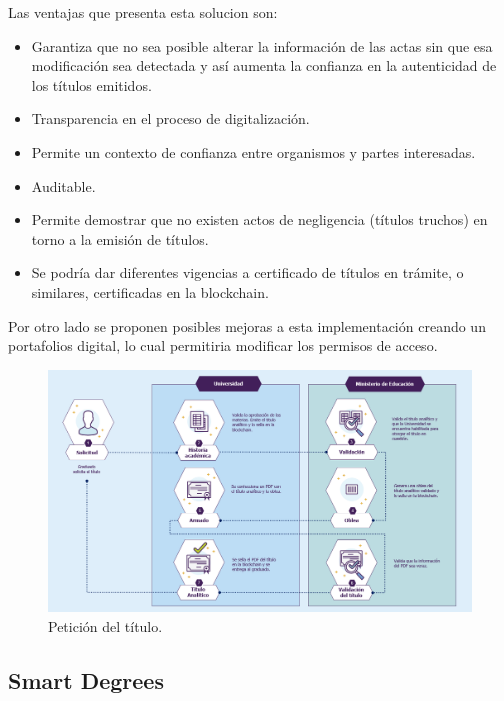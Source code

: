 \documentclass[11pt,a4paper]{article}
\begin{document}
        Las ventajas que presenta esta solucion son:
        
        \begin{itemize}
            \item Garantiza que no sea posible alterar la 
            información de las actas sin que esa modificación sea detectada y así aumenta la confianza en la autenticidad de los títulos emitidos. 
            \item Transparencia en el proceso de digitalización.
            \item Permite un contexto de confianza entre organismos y partes interesadas. 
            \item Auditable.
            \item Permite demostrar que no existen actos de negligencia (títulos truchos) en torno a la emisión de títulos.
            \item Se podría dar diferentes vigencias a certificado de títulos en trámite, o similares, certificadas en la blockchain.
        \end{itemize}

        Por otro lado se proponen posibles mejoras a esta implementación creando un portafolios digital, lo cual 
        permitiria modificar los permisos de acceso.

        \begin{figure}
            \centering
            \includegraphics[width=\textwidth]{Img/cuadro_problematica.png}
            \caption{Petición del título.}
            \label{fig:cuadro_problematica}
        \end{figure}

        \subsection{Smart Degrees}
        
\end{document}
